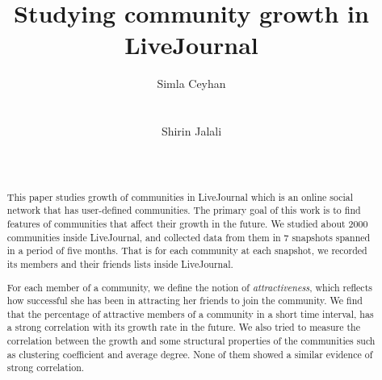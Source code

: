\documentclass{sig-alternate}
\begin{document}
\newcommand{\Cc}{\mathcal{C}}
\newcommand{\Vc}{\mathcal{V}}
\newcommand{\Ec}{\mathcal{V}}


\title{Studying  community growth in LiveJournal}
\author{
\alignauthor
Simla Ceyhan\\
       \\
       \\
\alignauthor
Shirin Jalali\\
       \\
       \\
       }

\maketitle
\begin{abstract}
This paper studies growth of communities in LiveJournal which is  an online social network that has 
user-defined communities. The primary goal of this work is to find features of communities that affect their growth in the future.  We studied about $2000$ communities  inside LiveJournal, and collected data from them in 7 snapshots spanned in a period of five months.  That is for each community at each snapshot, we recorded its members and their friends lists inside LiveJournal.

For each member of a community, we define the notion of  \emph{attractiveness}, which reflects how successful she has been in attracting her friends to join the community. We find that the percentage of attractive members of a community in a short time interval, has a strong correlation with its growth rate in the future. We also tried to measure the correlation between the growth and some structural properties of the communities such as  clustering coefficient and average degree. None of them showed a similar evidence of strong correlation.

\end{abstract}


\end{document}
